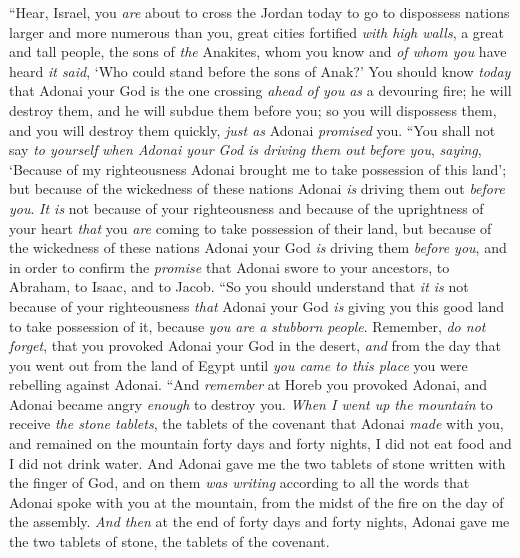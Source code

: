 \begin{biblechapter} %
\verse “Hear, Israel, you \textit{are} about to cross the Jordan today to go to dispossess nations larger and more numerous than you, great cities fortified \textit{with high walls},
\verse a great and tall people, the sons of \textit{the} Anakites, whom you know and \textit{of whom you} have heard \textit{it said}, ‘Who could stand before the sons of Anak?’
\verse You should know \textit{today} that Adonai your God is the one crossing \textit{ahead of you} \textit{as} a devouring fire; he will destroy them, and he will subdue them before you; so you will dispossess them, and you will destroy them quickly, \textit{just as} Adonai \textit{promised} you.
\verse “You shall not say \textit{to yourself} \textit{when Adonai your God is driving them out} \textit{before you}, \textit{saying}, ‘Because of my righteousness Adonai brought me to take possession of this land’; but because of the wickedness of these nations Adonai \textit{is} driving them out \textit{before you}.
\verse \textit{It is} not because of your righteousness and because of the uprightness of your heart \textit{that} you \textit{are} coming to take possession of their land, but because of the wickedness of these nations Adonai your God \textit{is} driving them \textit{before you}, and in order to confirm the \textit{promise} that Adonai swore to your ancestors, to Abraham, to Isaac, and to Jacob.
\verse “So you should understand that \textit{it is} not because of your righteousness \textit{that} Adonai your God \textit{is} giving you this good land to take possession of it, because \textit{you are a stubborn people}. 
\verse Remember, \textit{do not forget}, that you provoked Adonai your God in the desert, \textit{and} from the day that you went out from the land of Egypt until \textit{you came to this place} you were rebelling against Adonai.
\verse “And \textit{remember} at Horeb you provoked Adonai, and Adonai became angry \textit{enough} to destroy you.
\verse \textit{When I went up the mountain} to receive \textit{the stone tablets}, the tablets of the covenant that Adonai \textit{made} with you, and remained on the mountain forty days and forty nights, I did not eat food and I did not drink water.
\verse And Adonai gave me the two tablets of stone written with the finger of God, and on them \textit{was writing} according to all the words that Adonai spoke with you at the mountain, from the midst of the fire on the day of the assembly.
\verse \textit{And then} at the end of forty days and forty nights, Adonai gave me the two tablets of stone, the tablets of the covenant.

\end{biblechapter}
